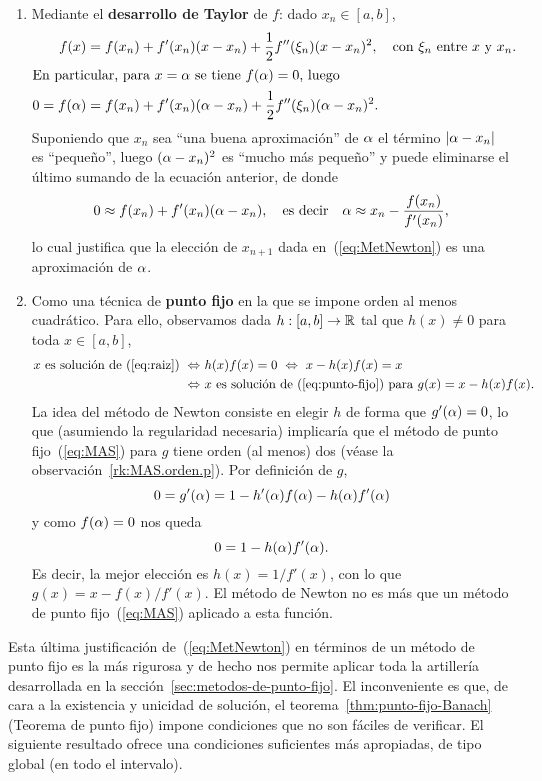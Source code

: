 \begin{enumerate}
\item Mediante el \textbf{desarrollo de Taylor} de $f$: dado $x_n\in [a,b]$,
  \begin{align*}
    f(x)&=f(x_n) + f'(x_n)(x-x_n) + \frac 12 f''(\xi_n)(x-x_n)^2, \quad
    \text{con $\xi_n$ entre $x$ y $x_n$}.
    \\
    \intertext{En particular, para $x=\alpha$ se tiene $f(\alpha)=0$,
      luego}
    0=f(\alpha)&=f(x_n) + f'(x_n)(\alpha-x_n) + \frac 12 f''(\xi_n)(\alpha-x_n)^2.
  \end{align*}
  Suponiendo que $x_n$ sea ``una buena aproximación'' de $\alpha$ el
  término $|\alpha-x_n|$ es ``pequeño'', luego $(\alpha-x_n)^2$ es
  ``mucho más pequeño'' y puede eliminarse el último sumando de la
  ecuación anterior, de donde
  \begin{equation*}
        0 \approx f(x_n) + f'(x_n)(\alpha-x_n), \quad \text{es decir} \quad
        \alpha \approx x_n - \frac{f(x_n)}{f'(x_n)},
  \end{equation*}
  lo cual justifica que la elección de $x_{n+1}$ dada
  en~(\ref{eq:MetNewton}) es una aproximación de $\alpha$.
\item Como una técnica de \textbf{punto fijo} en la que se impone
  orden al menos cuadrático. %
  Para ello, observamos dada $h:[a,b]\to\operatorname{{\mathbb R}}$ tal que $h(x)\neq 0$
  para toda $x\in[a,b]$,
  \begin{align*}
    x \text{ es solución de~(\ref{eq:raiz})} \ \Leftrightarrow\ & h(x)f(x)=0 
    \ \Leftrightarrow\ x-h(x)f(x)=x \\
    \ \Leftrightarrow\ & x \text{ es solución de~(\ref{eq:punto-fijo}) para }
    g(x)=x-h(x)f(x).
  \end{align*}
  La idea del método de Newton consiste en elegir $h$ de forma que
  $g'(\alpha)=0$, lo que (asumiendo la regularidad necesaria) implicaría
  que el método de punto fijo~(\ref{eq:MAS}) para $g$ tiene orden (al
  menos) dos (véase la observación~\ref{rk:MAS.orden.p}). Por
  definición de $g$,
  $$
  0 = g'(\alpha) = 1-h'(\alpha)f(\alpha)-h(\alpha)f'(\alpha)
  $$
  y como $f(\alpha)=0$ nos queda 
  $$
  0 = 1-h(\alpha)f'(\alpha).
  $$
  Es decir, la mejor elección es $h(x)=1/f'(x)$, con lo que
  $g(x)=x-f(x)/f'(x)$. El método de Newton no es más
  que un método de punto fijo~(\ref{eq:MAS}) aplicado a esta función.
\end{enumerate}

Esta última justificación de~(\ref{eq:MetNewton}) en términos de un
método de punto fijo es la más rigurosa y de hecho nos permite aplicar
toda la artillería desarrollada en la
sección~\ref{sec:metodos-de-punto-fijo}. El inconveniente es que, de
cara a la existencia y unicidad de solución, el
teorema~\ref{thm:punto-fijo-Banach} (Teorema de punto fijo) impone
condiciones que no son fáciles de verificar.  El siguiente resultado
ofrece una condiciones suficientes más apropiadas, de tipo global (en
todo el intervalo).

